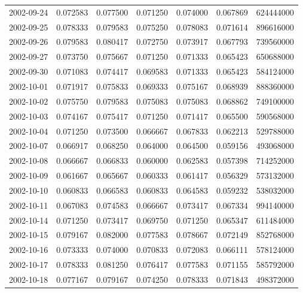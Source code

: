 \begin{tabular}{lrrrrrr}
2002-09-24 &    0.072583 &    0.077500 &    0.071250 &    0.074000 &    0.067869 &   624444000 \\
2002-09-25 &    0.078333 &    0.079583 &    0.075250 &    0.078083 &    0.071614 &   896616000 \\
2002-09-26 &    0.079583 &    0.080417 &    0.072750 &    0.073917 &    0.067793 &   739560000 \\
2002-09-27 &    0.073750 &    0.075667 &    0.071250 &    0.071333 &    0.065423 &   650688000 \\
2002-09-30 &    0.071083 &    0.074417 &    0.069583 &    0.071333 &    0.065423 &   584124000 \\
2002-10-01 &    0.071917 &    0.075833 &    0.069333 &    0.075167 &    0.068939 &   888360000 \\
2002-10-02 &    0.075750 &    0.079583 &    0.075083 &    0.075083 &    0.068862 &   749100000 \\
2002-10-03 &    0.074167 &    0.075417 &    0.071250 &    0.071417 &    0.065500 &   590568000 \\
2002-10-04 &    0.071250 &    0.073500 &    0.066667 &    0.067833 &    0.062213 &   529788000 \\
2002-10-07 &    0.066917 &    0.068250 &    0.064000 &    0.064500 &    0.059156 &   493068000 \\
2002-10-08 &    0.066667 &    0.066833 &    0.060000 &    0.062583 &    0.057398 &   714252000 \\
2002-10-09 &    0.061667 &    0.065667 &    0.060333 &    0.061417 &    0.056329 &   573132000 \\
2002-10-10 &    0.060833 &    0.066583 &    0.060833 &    0.064583 &    0.059232 &   538032000 \\
2002-10-11 &    0.067083 &    0.074583 &    0.066667 &    0.073417 &    0.067334 &   994140000 \\
2002-10-14 &    0.071250 &    0.073417 &    0.069750 &    0.071250 &    0.065347 &   611484000 \\
2002-10-15 &    0.079167 &    0.082000 &    0.077583 &    0.078667 &    0.072149 &   852768000 \\
2002-10-16 &    0.073333 &    0.074000 &    0.070833 &    0.072083 &    0.066111 &   578124000 \\
2002-10-17 &    0.078333 &    0.081250 &    0.076417 &    0.077583 &    0.071155 &   585792000 \\
2002-10-18 &    0.077167 &    0.079167 &    0.074250 &    0.078333 &    0.071843 &   498372000 \\

\end{tabular}
